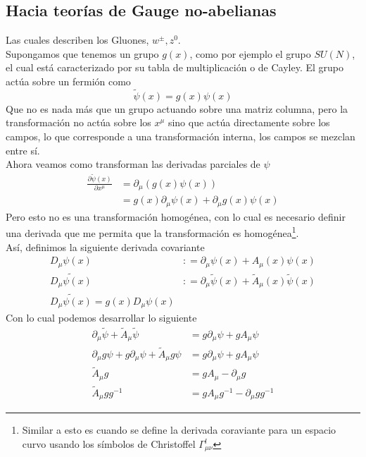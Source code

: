 \documentclass[../main.tex]{subfiles}
\begin{document}
 \subsection{Hacia teorías de Gauge no-abelianas}
 Las cuales describen los Gluones, $w^{\pm}, z^0$. \\
Supongamos que tenemos un grupo $g(x)$, como por ejemplo el grupo $SU(N)$, el cual está caracterizado por su tabla de multiplicación o de Cayley. El grupo actúa sobre un fermión como
\begin{equation}
  \tilde{\psi}(x) = g(x)\psi(x)
 \end{equation}
 Que no es nada más que un grupo actuando sobre una matriz columna, pero la transformación no actúa sobre los  $x^\mu$ sino que actúa directamente sobre los campos, lo que corresponde a una transformación interna, los campos se mezclan entre sí. \\
 Ahora veamos como transforman las derivadas parciales de $\psi$
 \begin{align*}
   \frac{\partial \tilde{\psi}(x)}{\partial x^\mu} & = \partial_\mu \left( g(x)\psi(x) \right) \\
   & = g(x) \partial_\mu \psi(x) + \partial_\mu g(x) \psi(x)
 \end{align*}
 Pero esto no es una transformación homogénea, con lo cual es necesario definir una derivada que me permita que la transformación es homogénea\footnote{Similar a esto es cuando se define la derivada coraviante para un espacio curvo usando los símbolos de Christoffel $\Gamma^l_{\mu \nu}$}.\\
 Así, definimos la siguiente derivada covariante
 \begin{align*}
   D_\mu \psi(x)&  : = \partial_\mu \psi(x) + A_\mu(x)\psi(x) \\
   \tilde{D_\mu\psi(x)}&  : = \partial_\mu\tilde{\psi}(x) + \tilde{{A}}_\mu (x)\tilde{\psi}(x) \\
   \tilde{D_\mu\psi(x)} = g(x)D_\mu\psi(x)
 \end{align*}
 Con lo cual podemos desarrollar lo siguiente
 \begin{align*}
   \partial_\mu \tilde{\psi} + \tilde{{A}}_\mu \tilde{\psi} & = g\partial_\mu \psi + gA_\mu \psi \\
   \partial_\mu g \psi + g \partial_\mu \psi + \tilde{{A}}_\mu g\psi & = g\partial_\mu \psi + gA_\mu \psi \\
   \tilde{{A}}_\mu g & = gA_{\mu} - \partial_\mu g \\
   \tilde{{A}}_\mu g g^{-1} & = gA_\mu g^{-1} - \partial_\mu gg^{-1}
\end{align*}
\end{document}

